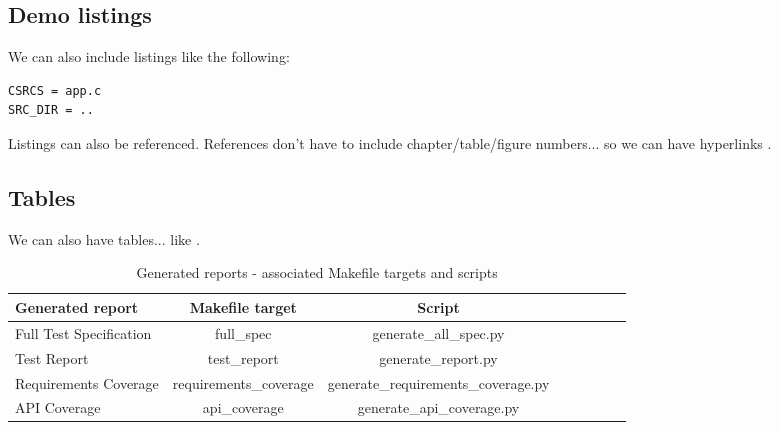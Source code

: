 \subsection{Demo listings}
We can also include listings like the following:

\lstset{language=make,caption=Application Makefile,label=lst:makefile-test}
\begin{lstlisting}
CSRCS = app.c
SRC_DIR = ..
\end{lstlisting}

Listings can also be referenced. References don't have to include
chapter/table/figure numbers... so we can have hyperlinks .

\subsection{Tables}
We can also have tables... like .

\begin{center}
\begin{table}[htb]
  \caption{Generated reports - associated Makefile targets and scripts}
  \begin{tabular}{l*{6}{c}r}
    Generated report & Makefile target & Script \\
    \hline
    Full Test Specification & full_spec & generate_all_spec.py  \\
    Test Report & test_report & generate_report.py  \\
    Requirements Coverage & requirements_coverage &
    generate_requirements_coverage.py   \\
    API Coverage & api_coverage & generate_api_coverage.py  \\
  \end{tabular}
  \label{table:reports}
\end{table}
\end{center}
